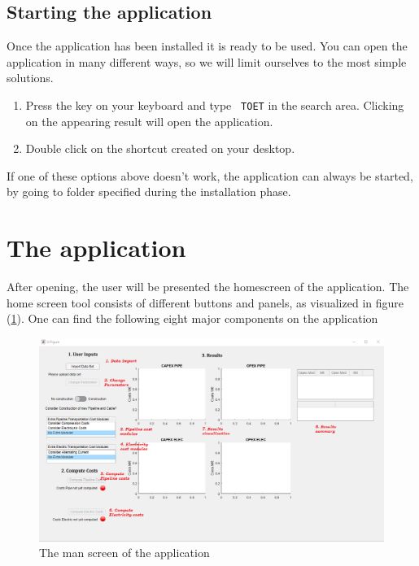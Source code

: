\documentclass{article}
\begin{document}
\subsection{Starting the application}
Once the application has been installed it is ready to be used. You can open the application in many different ways, so we will limit ourselves to the most simple solutions.
\begin{enumerate}
\item Press the  key on your keyboard  and type \texttt{ TOET} in the search area.  Clicking on the appearing result will open the application.
\item Double click on the shortcut created on your desktop.
\end{enumerate}

\begin{info}
If one of these options above doesn't work, the application can always be started, by going to folder specified during the installation phase.
\end{info}

\section{The application}

After opening, the user will be presented the homescreen of the application. The home screen tool consists of different buttons and panels, as visualized in figure (\ref{fig:open1}). One can find the following eight major components on the application

\begin{figure}[h]
  \centering
  \includegraphics[width=.75\linewidth]{open1.png}
  \caption{The man screen of the application}
  \label{fig:open1}
\end{figure}
\end{document}
